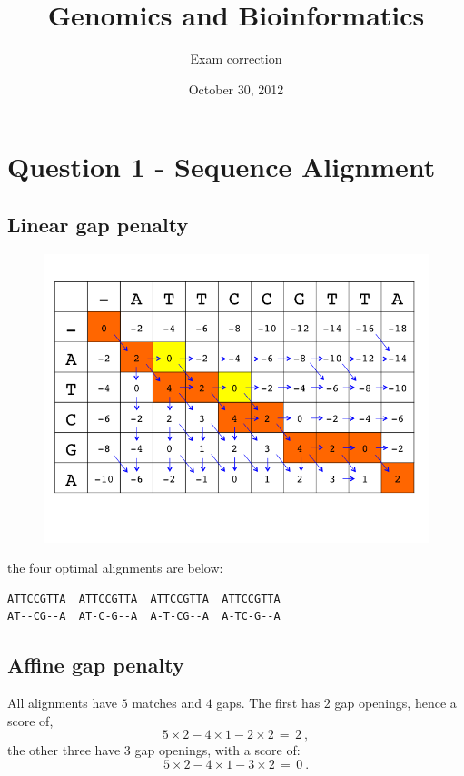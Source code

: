 \documentclass[a4paper,11pt]{article}
\title{Genomics and Bioinformatics}
\date{October 30, 2012}
\author{Exam correction}
\begin{document}
\maketitle

\section*{Question 1 - Sequence Alignment}

\subsection*{Linear gap penalty}

\begin{figure}[h]
\centering\includegraphics[scale=.4]{scoring_matrix.png}
\end{figure}

the four optimal alignments are below:

\begin{verbatim}
ATTCCGTTA  ATTCCGTTA  ATTCCGTTA  ATTCCGTTA
AT--CG--A  AT-C-G--A  A-T-CG--A  A-TC-G--A
\end{verbatim}

\subsection*{Affine gap penalty}

All alignments have $5$ matches and $4$ gaps. The first has $2$ gap
openings, hence a score of,
$$
5\times 2-4\times 1-2\times 2\,=\,2~,
$$
the other three have $3$ gap openings, with a score of:
$$
5\times 2-4\times 1-3\times 2\,=\,0~.
$$
\end{document}
